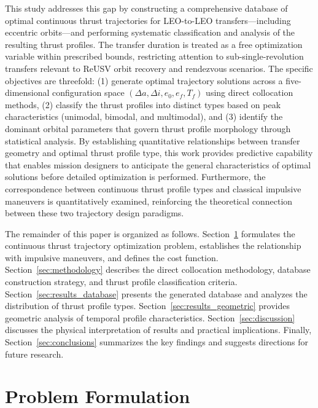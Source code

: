 \documentclass[a4paper,fleqn]{cas-dc}
\begin{document}
This study addresses this gap by constructing a comprehensive database of optimal continuous thrust trajectories for LEO-to-LEO transfers---including eccentric orbits---and performing systematic classification and analysis of the resulting thrust profiles. The transfer duration is treated as a free optimization variable within prescribed bounds, restricting attention to sub-single-revolution transfers relevant to ReUSV orbit recovery and rendezvous scenarios. The specific objectives are threefold: (1) generate optimal trajectory solutions across a five-dimensional configuration space $(\Delta a, \Delta i, e_0, e_f, T_f)$ using direct collocation methods, (2) classify the thrust profiles into distinct types based on peak characteristics (unimodal, bimodal, and multimodal), and (3) identify the dominant orbital parameters that govern thrust profile morphology through statistical analysis. By establishing quantitative relationships between transfer geometry and optimal thrust profile type, this work provides predictive capability that enables mission designers to anticipate the general characteristics of optimal solutions before detailed optimization is performed. Furthermore, the correspondence between continuous thrust profile types and classical impulsive maneuvers is quantitatively examined, reinforcing the theoretical connection between these two trajectory design paradigms.

The remainder of this paper is organized as follows. Section~\ref{sec:problem} formulates the continuous thrust trajectory optimization problem, establishes the relationship with impulsive maneuvers, and defines the cost function. Section~\ref{sec:methodology} describes the direct collocation methodology, database construction strategy, and thrust profile classification criteria. Section~\ref{sec:results_database} presents the generated database and analyzes the distribution of thrust profile types. Section~\ref{sec:results_geometric} provides geometric analysis of temporal profile characteristics. Section~\ref{sec:discussion} discusses the physical interpretation of results and practical implications. Finally, Section~\ref{sec:conclusions} summarizes the key findings and suggests directions for future research.


\section{Problem Formulation}\label{sec:problem}
\end{document}
